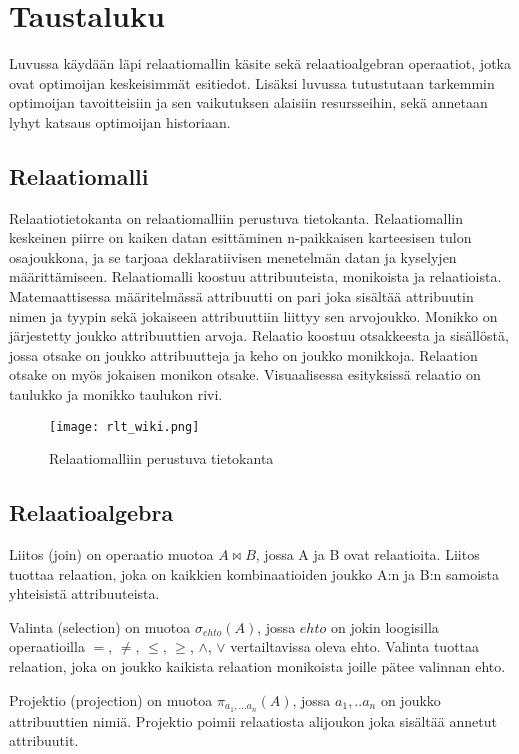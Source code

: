 \documentclass[finnish]{tktltiki2}
\theoremstyle{definition}
\theoremstyle{remark}
\begin{document}
\section{Taustaluku}
Luvussa käydään läpi relaatiomallin käsite sekä relaatioalgebran operaatiot, jotka ovat optimoijan keskeisimmät esitiedot. Lisäksi luvussa tutustutaan tarkemmin optimoijan tavoitteisiin ja sen vaikutuksen alaisiin resursseihin, sekä annetaan lyhyt katsaus optimoijan historiaan.
\subsection{Relaatiomalli}
Relaatiotietokanta on relaatiomalliin \cite{codd1970relational} perustuva tietokanta. Relaatiomallin keskeinen piirre on kaiken datan esittäminen n-paikkaisen karteesisen tulon osajoukkona, ja se tarjoaa deklaratiivisen menetelmän datan ja kyselyjen määrittämiseen. Relaatiomalli koostuu attribuuteista, monikoista ja relaatioista. Matemaattisessa määritelmässä attribuutti on pari joka sisältää attribuutin nimen ja tyypin sekä jokaiseen attribuuttiin liittyy sen arvojoukko. Monikko on järjestetty joukko attribuuttien arvoja. Relaatio koostuu otsakkeesta ja sisällöstä, jossa otsake on joukko attribuutteja ja keho on joukko monikkoja. Relaation otsake on myös jokaisen monikon otsake. Visuaalisessa esityksissä relaatio on taulukko ja monikko taulukon rivi. 

\begin{figure}[!h]
  \caption{Relaatiomalliin perustuva tietokanta}
  \centering
    \texttt{[image: rlt\_wiki.png]}
\end{figure}

\subsection{Relaatioalgebra}
Liitos (join) on operaatio muotoa $A\bowtie B$, jossa A ja B ovat relaatioita. Liitos tuottaa relaation, joka on kaikkien kombinaatioiden joukko A:n ja B:n samoista yhteisistä attribuuteista.

Valinta (selection) on muotoa $\sigma_{ehto}(A)$, jossa $ehto$ on jokin loogisilla operaatioilla $=$, $\neq$, $\leq$, $\geq$, $\wedge$, $\vee$ vertailtavissa oleva ehto. Valinta tuottaa relaation, joka on joukko kaikista relaation monikoista joille pätee valinnan ehto.	

Projektio (projection) on muotoa $\pi_{a_1,...a_n}(A)$, jossa $a_1,..a_n$ on joukko attribuuttien nimiä. Projektio poimii relaatiosta alijoukon joka sisältää annetut attribuutit.
\end{document}
